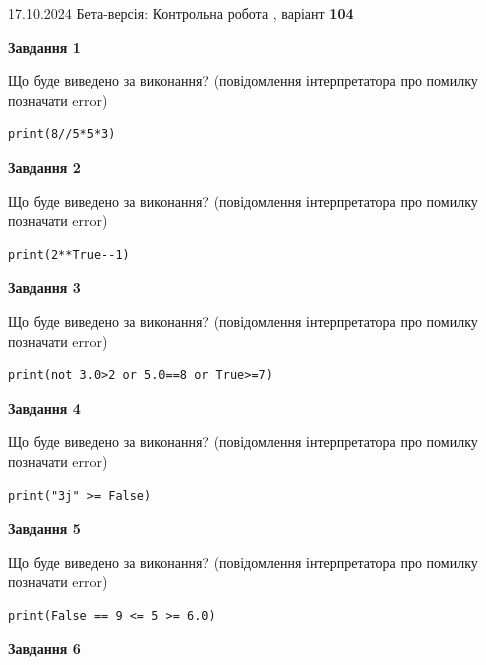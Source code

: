 \documentclass[12pt, ukrainian]{article}
\begin{document}
{\Large{17.10.2024 Бета-версія: Контрольна робота , варіант  \No \textbf { 104 }\par}}
{
\begin {large}
{\begin {center}\textbf{Завдання 1}\end {center}}

Що буде виведено за виконання? (повідомлення інтерпретатора про помилку позначати error)\par
\begin{verbatim}
print(8//5*5*3)
\end{verbatim}

{\begin {center}\textbf{Завдання 2}\end {center}}

Що буде виведено за виконання? (повідомлення інтерпретатора про помилку позначати error)\par
\begin{verbatim}
print(2**True--1)
\end{verbatim}

{\begin {center}\textbf{Завдання 3}\end {center}}

Що буде виведено за виконання? (повідомлення інтерпретатора про помилку позначати error)\par
\begin{verbatim}
print(not 3.0>2 or 5.0==8 or True>=7)
\end{verbatim}

{\begin {center}\textbf{Завдання 4}\end {center}}

Що буде виведено за виконання? (повідомлення інтерпретатора про помилку позначати error)\par
\begin{verbatim}
print("3j" >= False)
\end{verbatim}

{\begin {center}\textbf{Завдання 5}\end {center}}

Що буде виведено за виконання? (повідомлення інтерпретатора про помилку позначати error)\par
\begin{verbatim}
print(False == 9 <= 5 >= 6.0)
\end{verbatim}

{\begin {center}\textbf{Завдання 6}\end {center}}


\end{large}}
\end{document}
